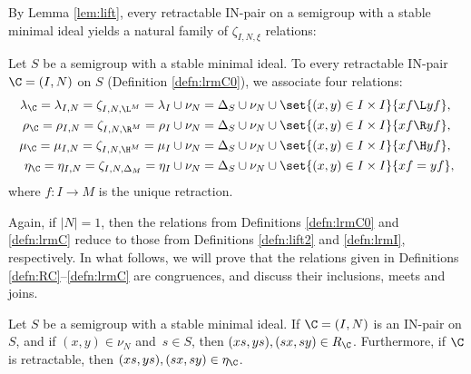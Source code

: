 By Lemma \ref{lem:lift}, every retractable IN-pair on a semigroup with a stable minimal ideal yields a natural family of $\zeta_{I,N,\xi}$ relations:

\begin{definition}
\label{defn:lrmC}
Let $S$ be a semigroup with a stable minimal ideal.  To every retractable IN-pair $\C=(I,N)$ on $S$ (Definition \ref{defn:lrmC0}), we associate four relations:
\begin{align*}
\lambda_\C=\lambda_{I,N}=\zeta_{I,N,{\L^M}}=\lambda_I\cup\nu_N&=\Delta_S\cup\nu_N\cup\set{
  (x,y)\in I\times I}{ xf\L yf},\\
\rho_\C=\rho_{I,N}=\zeta_{I,N,{\R^M}}=\rho_I\cup\nu_N&=\Delta_S\cup\nu_N\cup\set{
  (x,y)\in I\times I}{ xf\R yf},\\
\mu_\C=\mu_{I,N}=\zeta_{I,N,{\H^M}}=\mu_I\cup\nu_N&=\Delta_S\cup\nu_N\cup\set{ (x,y)\in I\times I}{ xf\H yf},\\
\eta_\C=\eta_{I,N}=\zeta_{I,N,\Delta_M}=\eta_I\cup\nu_N&=\Delta_S\cup\nu_N\cup\set{ (x,y)\in I\times I}{ xf= yf},
\end{align*}
where $f:I\to M$ is the unique retraction.
\end{definition}

Again, if $|N|=1$, then the relations from Definitions \ref{defn:lrmC0} and
\ref{defn:lrmC} reduce to those from Definitions \ref{defn:lift2} and \ref{defn:lrmI}, respectively.  In what
follows, we will prove that the relations given in Definitions \ref{defn:RC}--\ref{defn:lrmC} are congruences, and discuss their inclusions, meets and
joins.

\begin{lemma}
\label{lem:nu}
Let $S$ be a semigroup with a stable minimal ideal.  If $\C=(I,N)$ is an IN-pair on $S$, and if $(x,y)\in\nu_N$ and~$s\in S$, then $(xs,ys),(sx,sy)\in R_\C$.  Furthermore, if $\C$ is retractable, then ${(xs,ys),(sx,sy)\in\eta_\C}$.
\end{lemma}

